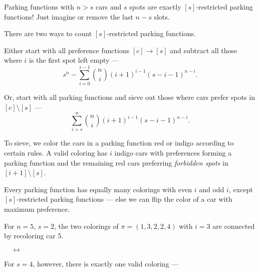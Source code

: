 \documentclass[thesis]{hmcposter}
\newcommand{\mzncar}[3][(0,0)]{
\begin{scope}[shift={#1}]
\shade[top color=#2, bottom color=#3, shading angle=90, draw=white, rounded corners=0.7ex, very thick] (0.75,.25) -- ++(0,0.5) -- ++(0.5,0.15) -- ++(1.5,0) -- ++(0.5,0) -- ++(0,-0.65) -- (0.75,.25) -- cycle;
\draw[thick, rounded corners=0.2ex, fill=white, thick] (1.25,0.85) -- ++(0.5,0.35) -- ++(0.8,0) -- ++(0.3,-0.35) -- (1.25,0.85);
\draw[thick] (2.1,0.85) -- (2.1,1.2);
\draw[fill=gray!80,thin] (1.375,.25) circle[radius=.2];
\draw[fill=gray!80,thin] (2.76,.25) circle[radius=.2];
\end{scope}
}
\begin{document}
\begin{poster}
Parking functions with $n > s$ cars and $s$ spots are exactly $[s]$-restricted parking functions! Just imagine or remove the last $n - s$ slots. 

There are two ways to count $[s]$-restricted parking functions.

Either start with all preference functions $[c] \to [s]$ and subtract all those where $i$ is the first spot left empty ---
\[
	s^{n} - \sum_{i = 0}^{s - 1} \binom{n}{i} (i + 1)^{i - 1} (s - i - 1)^{n - i}.
\]

Or, start with all parking functions and sieve out those where cars prefer spots in $[c] \setminus [s]$ ---
\[
	\sum_{i = s}^{n} \binom{n}{i} (i + 1)^{i - 1} (s - i - 1)^{n - i}.
\]

To sieve, we color the cars in a parking function red or indigo according to certain rules. A valid coloring has $i$ indigo cars with preferences forming a parking function and the remaining red cars preferring \emph{forbidden spots} in $[i + 1] \setminus [s]$.

Every parking function has equally many colorings with even $i$ and odd $i$, except $[s]$-restricted parking functions --- else we can flip the color of a car with maximum preference.

For $n=5$, $s = 2$, the two colorings of $\pi = (1,3,2,2,4)$ with $i = 3$ are connected by recoloring car 5.
\begin{center}
 $\quad \longleftrightarrow \quad$
\end{center}

For $s = 4$, however, there is exactly one valid coloring ---

\begin{center}
\end{center}


\end{poster}
\end{document}
